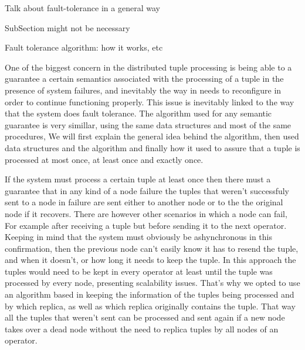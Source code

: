 \documentclass[times, 10pt,twocolumn]{article}
\begin{document}
Talk about fault-tolerance in a general way


SubSection might not be necessary


Fault tolerance algorithm: how it works, etc


One of the biggest concern in the distributed tuple processing is being
able to a guarantee a certain semantics associated with the processing of
a tuple in the presence of system failures, and inevitably the way in
needs to reconfigure in order to continue functioning properly. This issue
is inevitably linked to the way that the system does fault tolerance. The
algorithm used for any semantic guarantee is very simillar, using 
the same data structures and most of the same procedures,
We will first explain the general idea behind the algorithm, then used data structures and the algorithm and
finally how it used to assure that a tuple is processed at most once,
at least once and exactly once.



If the system
must process a certain tuple at least once then there must a guarantee
that in any kind of a node failure the tuples that weren't successfuly
sent to a node in failure are sent either to another node or to the the
original node if it recovers. There are however other scenarios in which a
node can fail, For example after receiving a tuple but before sending it
to the next operator. Keeping in mind that the system must
obviously be ashynchronous in this confirmation, then the previous node
can't easily know it has to resend the tuple, and when it doesn't, or how
long it needs to keep the tuple.  In this approach the tuples would need
to be kept in every operator at least until the tuple was processed by
every node, presenting scalability issues. That's why we opted to use
an algorithm based in keeping the information of the tuples being processed
and by which replica, as well as which replica originally contains the tuple.
That way all the tuples that weren't sent can be processed and sent again
if a new node takes over a dead node without the need to replica tuples by
all nodes of an operator.
\end{document}
